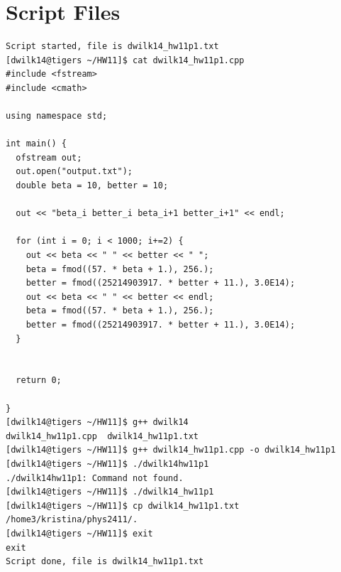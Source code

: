 \documentclass{article}
\begin{document}
\section{Script Files}
\begin{verbatim}
Script started, file is dwilk14_hw11p1.txt
[dwilk14@tigers ~/HW11]$ cat dwilk14_hw11p1.cpp
#include <fstream>
#include <cmath>

using namespace std;

int main() {
  ofstream out;
  out.open("output.txt");
  double beta = 10, better = 10;

  out << "beta_i better_i beta_i+1 better_i+1" << endl;

  for (int i = 0; i < 1000; i+=2) {
    out << beta << " " << better << " ";
    beta = fmod((57. * beta + 1.), 256.);
    better = fmod((25214903917. * better + 11.), 3.0E14);
    out << beta << " " << better << endl;
    beta = fmod((57. * beta + 1.), 256.);
    better = fmod((25214903917. * better + 11.), 3.0E14);
  }


  return 0;

}
[dwilk14@tigers ~/HW11]$ g++ dwilk14
dwilk14_hw11p1.cpp  dwilk14_hw11p1.txt  
[dwilk14@tigers ~/HW11]$ g++ dwilk14_hw11p1.cpp -o dwilk14_hw11p1
[dwilk14@tigers ~/HW11]$ ./dwilk14hw11p1
./dwilk14hw11p1: Command not found.
[dwilk14@tigers ~/HW11]$ ./dwilk14_hw11p1                                                                                                                                                    
[dwilk14@tigers ~/HW11]$ cp dwilk14_hw11p1.txt /home3/kristina/phys2411/.
[dwilk14@tigers ~/HW11]$ exit
exit
Script done, file is dwilk14_hw11p1.txt
\end{verbatim}
\end{document}
